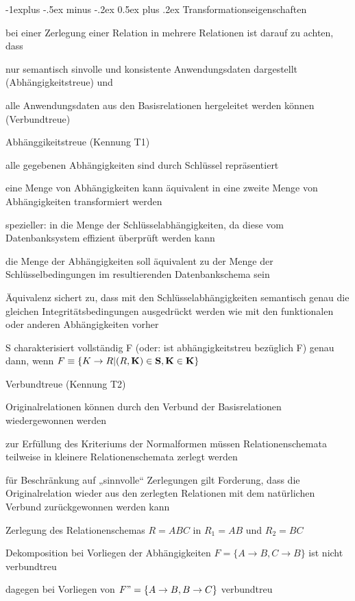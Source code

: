 \documentclass[a4paper]{article}
\makeatletter
\renewcommand{\subsection}{\@startsection{subsection}{2}{0mm}%
                                {-1explus -.5ex minus -.2ex}%
                                {0.5ex plus .2ex}%
                                {\normalfont\normalsize\bfseries}}
\makeatother
\begin{document}
\begin{multicols}{3}
\subsection{Transformationseigenschaften}
\begin{itemize*}
    \item bei einer Zerlegung einer Relation in mehrere Relationen ist darauf zu achten, dass
    \begin{itemize*}
        \item nur semantisch sinvolle und konsistente Anwendungsdaten dargestellt (Abhängigkeitstreue) und
        \item alle Anwendungsdaten aus den Basisrelationen hergeleitet werden können (Verbundtreue)
    \end{itemize*}
    \item Abhänggikeitstreue (Kennung T1)
    \begin{itemize*}
        \item alle gegebenen Abhängigkeiten sind durch Schlüssel repräsentiert
        \item eine Menge von Abhängigkeiten kann äquivalent in eine zweite Menge von Abhängigkeiten transformiert werden
        \item spezieller: in die Menge der Schlüsselabhängigkeiten, da diese vom Datenbanksystem effizient überprüft werden kann
        \item die Menge der Abhängigkeiten soll äquivalent zu der Menge der Schlüsselbedingungen im resultierenden Datenbankschema sein
        \item Äquivalenz sichert zu, dass mit den Schlüsselabhängigkeiten semantisch genau die gleichen Integritätsbedingungen ausgedrückt werden wie mit den funktionalen oder anderen Abhängigkeiten vorher
        \item S charakterisiert vollständig F (oder: ist abhängigkeitstreu bezüglich F) genau dann, wenn $F\equiv \{K\rightarrow R | (R,\bf{K})\in S, K\in\bf{K}\}$
    \end{itemize*}
    \item Verbundtreue (Kennung T2)
    \begin{itemize*}
        \item Originalrelationen können durch den Verbund der Basisrelationen wiedergewonnen werden
        \item zur Erfüllung des Kriteriums der Normalformen müssen Relationenschemata teilweise in kleinere Relationenschemata zerlegt werden
        \item für Beschränkung auf „sinnvolle“ Zerlegungen gilt Forderung, dass die Originalrelation wieder aus den zerlegten Relationen mit dem natürlichen Verbund zurückgewonnen werden kann
        \item Zerlegung des Relationenschemas $R = ABC$ in $R_1 = AB$ und $R_2 = BC$
        \item Dekomposition bei Vorliegen der Abhängigkeiten $F = \{A \rightarrow B, C \rightarrow B\}$ ist nicht verbundtreu
        \item dagegen bei Vorliegen von $F" = \{A \rightarrow B, B \rightarrow C\}$ verbundtreu
    \end{itemize*}
\end{itemize*}


\end{multicols}
\end{document}
